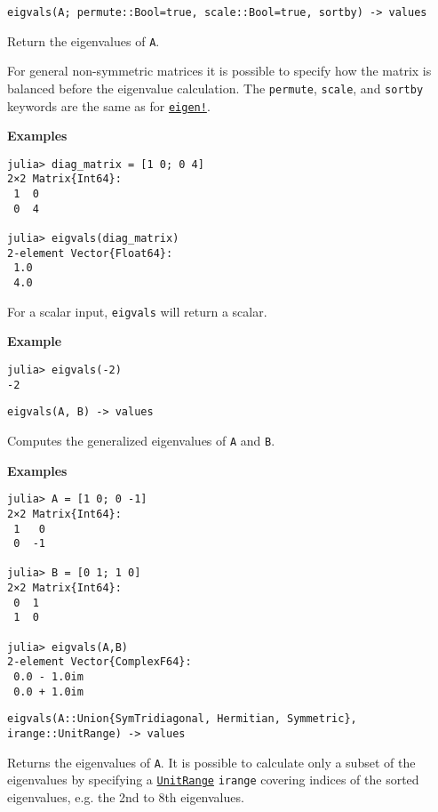 \begin{adjustwidth}{2em}{0pt}


\begin{verbatim}
eigvals(A; permute::Bool=true, scale::Bool=true, sortby) -> values
\end{verbatim}

Return the eigenvalues of \texttt{A}.

For general non-symmetric matrices it is possible to specify how the matrix is balanced before the eigenvalue calculation. The \texttt{permute}, \texttt{scale}, and \texttt{sortby} keywords are the same as for \hyperlink{11207008815152064958}{\texttt{eigen!}}.

\textbf{Examples}


\begin{verbatim}
julia> diag_matrix = [1 0; 0 4]
2×2 Matrix{Int64}:
 1  0
 0  4

julia> eigvals(diag_matrix)
2-element Vector{Float64}:
 1.0
 4.0
\end{verbatim}



For a scalar input, \texttt{eigvals} will return a scalar.

\textbf{Example}


\begin{verbatim}
julia> eigvals(-2)
-2
\end{verbatim}




\begin{lstlisting}
eigvals(A, B) -> values
\end{lstlisting}

Computes the generalized eigenvalues of \texttt{A} and \texttt{B}.

\textbf{Examples}


\begin{verbatim}
julia> A = [1 0; 0 -1]
2×2 Matrix{Int64}:
 1   0
 0  -1

julia> B = [0 1; 1 0]
2×2 Matrix{Int64}:
 0  1
 1  0

julia> eigvals(A,B)
2-element Vector{ComplexF64}:
 0.0 - 1.0im
 0.0 + 1.0im
\end{verbatim}




\begin{lstlisting}
eigvals(A::Union{SymTridiagonal, Hermitian, Symmetric}, irange::UnitRange) -> values
\end{lstlisting}

Returns the eigenvalues of \texttt{A}. It is possible to calculate only a subset of the eigenvalues by specifying a \hyperlink{9165955949298153694}{\texttt{UnitRange}} \texttt{irange} covering indices of the sorted eigenvalues, e.g. the 2nd to 8th eigenvalues.


\end{adjustwidth}
